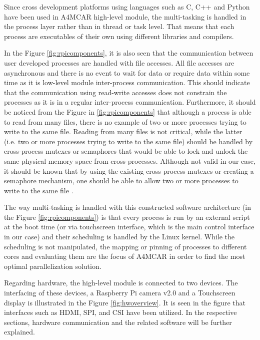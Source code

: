 Since cross development platforms using languages such as C, C++ and Python have been used in A4MCAR high-level module, the multi-tasking is handled in the process layer rather than in thread or task level. That means that each process are executables of their own using different libraries and compilers. 

In the Figure \ref{fig:rpicomponents}, it is also seen that the communication between user developed processes are handled with file accesses. All file accesses are asynchronous and there is no event to wait for data or require data within some time as it is low-level module inter-process communication. This should indicate that the communication using read-write accesses does not constrain the processes as it is in a regular inter-process communication. Furthermore, it should be noticed from the Figure in \ref{fig:rpicomponents} that although a process is able to read from many files, there is no example of two or more processes trying to write to the same file. Reading from many files is not critical, while the latter (i.e. two or more processes trying to write to the same file) should be handled by cross-process mutexes or semaphores that would be able to lock and unlock the same physical memory space from cross-processes. Although not valid in our case, it should be known that by using the existing cross-process mutexes or creating a semaphore mechanism, one should be able to allow two or more processes to write to the same file \cite{linuxkernelbook}.

The way multi-tasking is handled with this constructed software architecture (in the Figure \ref{fig:rpicomponents}) is that every process is run by an external script at the boot time (or via touchscreen interface, which is the main control interface in our case) and their scheduling is handled by the Linux kernel. While the scheduling is not manipulated, the mapping or pinning of processes to different cores and evaluating them are the focus of A4MCAR in order to find the most optimal parallelization solution.

Regarding hardware, the high-level module is connected to two devices. The interfacing of these devices, a Raspberry Pi camera v2.0 and a Touchscreen display is illustrated in the Figure \ref{fig:hwoverview}. It is seen in the figure that interfaces such as HDMI, SPI, and CSI have been utilized. In the respective sections, hardware communication and the related software will be further explained.
